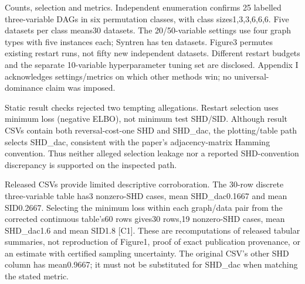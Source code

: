\documentclass[10pt]{article}
\begin{document}
Counts, selection and metrics. Independent enumeration confirms 25 labelled three-variable DAGs in six permutation classes, with class sizes1,3,3,6,6,6. Five datasets per class means30 datasets. The 20/50-variable settings use four graph types with five instances each; Syntren has ten datasets. Figure3 permutes existing restart runs, not fifty new independent datasets. Different restart budgets and the separate 10-variable hyperparameter tuning set are disclosed. Appendix I acknowledges settings/metrics on which other methods win; no universal-dominance claim was imposed.\par
Static result checks rejected two tempting allegations. Restart selection uses minimum loss (negative ELBO), not minimum test SHD/SID. Although result CSVs contain both reversal-cost-one SHD and SHD\_dac, the plotting/table path selects SHD\_dac, consistent with the paper’s adjacency-matrix Hamming convention. Thus neither alleged selection leakage nor a reported SHD-convention discrepancy is supported on the inspected path.\par
Released CSVs provide limited descriptive corroboration. The 30-row discrete three-variable table has3 nonzero-SHD cases, mean SHD\_dac0.1667 and mean SID0.2667. Selecting the minimum loss within each graph/data pair from the corrected continuous table’s60 rows gives30 rows,19 nonzero-SHD cases, mean SHD\_dac1.6 and mean SID1.8 [C1]. These are recomputations of released tabular summaries, not reproduction of Figure1, proof of exact publication provenance, or an estimate with certified sampling uncertainty. The original CSV’s other SHD column has mean0.9667; it must not be substituted for SHD\_dac when matching the stated metric.\par
\end{document}

